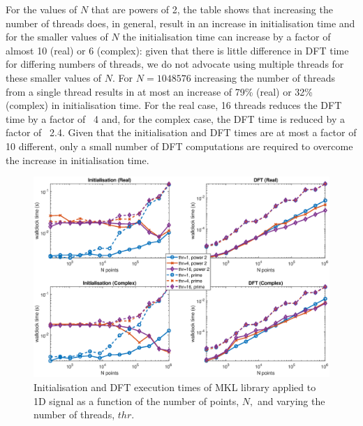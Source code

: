 \documentclass[a4paper]{article}
\begin{document}
For the values of $N$ that are powers of 2, the table shows that
increasing the number of threads does, in general, result in an
increase in initialisation time and for the smaller values of $N$ the
initialisation time can increase by a factor of almost 10 (real) or 6
(complex): given that there is little difference in DFT time for
differing numbers of threads, we do not advocate using multiple
threads for these smaller values of $N.$ For $N=1048576$ increasing
the number of threads from a single thread results in at most an
increase of 79\% (real) or 32\% (complex) in initialisation time. For
the real case, 16 threads reduces the DFT time by a factor of ~4 and,
for the complex case, the DFT time is reduced by a factor of
~2.4. Given that the initialisation and DFT times are at most a factor
of 10 different, only a small number of DFT computations are required
to overcome the increase in initialisation time.


\begin{figure}[htb]
    \centering
    \includegraphics[width=\linewidth]{../results/mkl_1d_thr.eps}
  \caption{Initialisation and DFT execution times of MKL library applied to 1D signal as a function of the
    number of points, $N,$ and varying the number of threads, $thr.$ }
  \label{1DMKL}
\end{figure}
\end{document}
